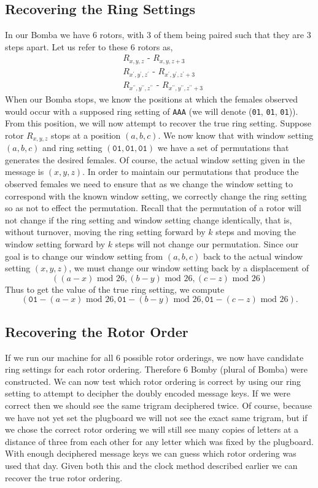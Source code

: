 \subsection{Recovering the Ring Settings}
In our Bomba we have 6 rotors, with 3 of them being paired such that
they are 3 steps apart. Let us refer to these 6 rotors as,
\begin{align*}
	 & R_{x,y,z} \texttt{ - } R_{x,y,z+3}
	\\
	 & R_{x^\prime,y^\prime,z^\prime} \texttt{ - }
	R_{x^\prime,y^\prime,z^\prime+3}
	\\
	 & R_{x^{\prime\prime},y^{\prime\prime},z^{\prime\prime}} \texttt{ -
	} R_{x^{\prime\prime},y^{\prime\prime},z^{\prime\prime}+3}
\end{align*}
When our Bomba stops, we know the positions at which the females
observed would occur with a supposed ring setting of \texttt{AAA} (we will denote (\texttt{01}, \texttt{01}, \texttt{01})).
From this position, we will now attempt to recover the true ring
setting. Suppose rotor $R_{x,y,z}$ stops at a position $(a,b,c)$. We now know that with window setting $(a,b,c)$ and ring setting $(\texttt{01}, \texttt{01}, \texttt{01})$ we have a set of permutations that generates the desired females. Of course, the actual window setting given in the message is $(x,y,z)$. In order to maintain our permutations that produce the observed females we need to ensure that as we change the window setting to correspond with the known window setting, we correctly change the ring setting so as not to effect the permutation. Recall that the permutation of a rotor will not change if the ring setting and window setting change identically, that is, without turnover, moving the ring setting forward by $k$ steps and moving the window setting forward by $k$ steps will not change our permutation. Since our goal is to change our window setting from $(a,b,c)$ back to the actual window setting $(x,y,z)$, we must change our window setting back by a displacement of
\[
	((a-x)\text{ mod } 26, (b-y)\text{ mod }26, (c-z)\text{ mod }26)
\]
Thus to get the value of the true ring setting, we compute
\[
	(\texttt{01} - (a- x)\text{ mod }26, \texttt{01} - (b- y)\text{ mod }26, \texttt{01} - (c-
	z)\text{ mod }26).
\]

\subsection{Recovering the Rotor Order}
If we run our machine for all $6$ possible rotor orderings, we now
have candidate ring settings for each rotor ordering. Therefore $6$ Bomby (plural of Bomba) were constructed. We can now test
which rotor ordering is correct by using our ring setting to attempt
to decipher the doubly encoded message keys. If we were correct then
we should see the same trigram deciphered twice. Of course, because
we have not yet set the plugboard we will not see the exact same
trigram, but if we chose the correct rotor ordering we will still see
many copies of letters at a distance of three from each other for any
letter which was fixed by the plugboard. With enough deciphered
message keys we can guess which rotor ordering was used that day.
Given both this and the clock method described earlier we can recover
the true rotor ordering.


